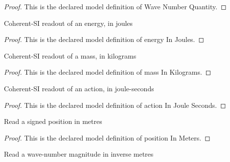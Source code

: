 \begin{proof}
  This is the declared model definition of Wave Number Quantity.
\end{proof}
\begin{definition}
  \label{def:physics:phyx-mini-0534:phyxminiproblems-problemphyxmini0534-energyinjoules}
  Coherent-SI readout of an energy, in joules
\end{definition}
\begin{proof}
  This is the declared model definition of energy In Joules.
\end{proof}
\begin{definition}
  \label{def:physics:phyx-mini-0534:phyxminiproblems-problemphyxmini0534-massinkilograms}
  Coherent-SI readout of a mass, in kilograms
\end{definition}
\begin{proof}
  This is the declared model definition of mass In Kilograms.
\end{proof}
\begin{definition}
  \label{def:physics:phyx-mini-0534:phyxminiproblems-problemphyxmini0534-actioninjouleseconds}
  Coherent-SI readout of an action, in joule-seconds
\end{definition}
\begin{proof}
  This is the declared model definition of action In Joule Seconds.
\end{proof}
\begin{definition}
  \label{def:physics:phyx-mini-0534:phyxminiproblems-problemphyxmini0534-positioninmeters}
  Read a signed position in metres
\end{definition}
\begin{proof}
  This is the declared model definition of position In Meters.
\end{proof}
\begin{definition}
  \label{def:physics:phyx-mini-0534:phyxminiproblems-problemphyxmini0534-wavenumberininversemeters}
  Read a wave-number magnitude in inverse metres
\end{definition}
